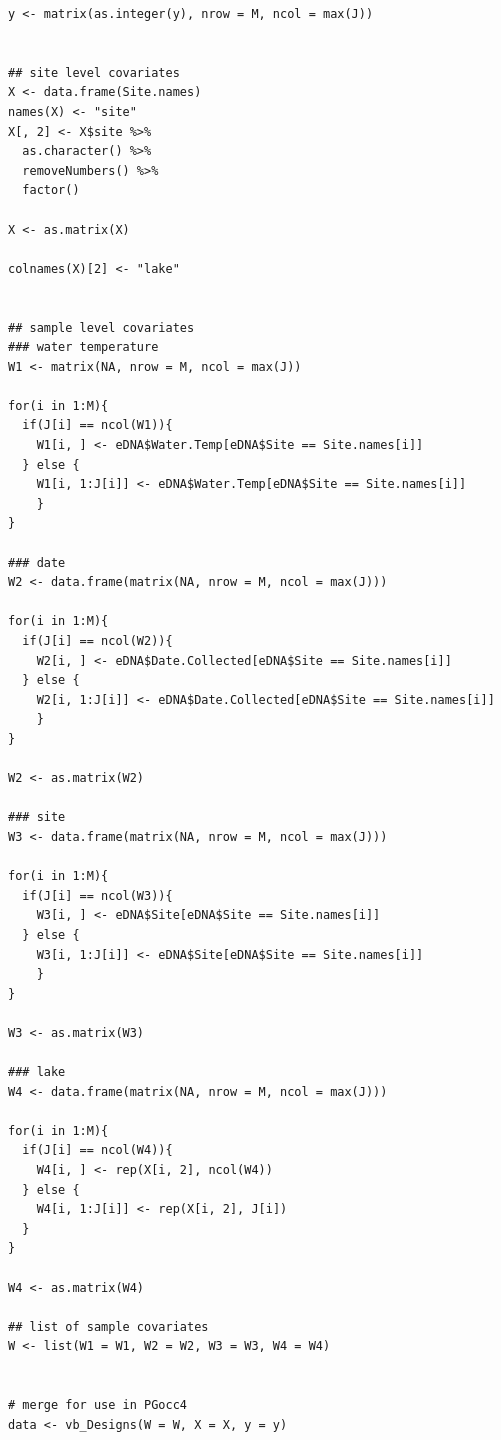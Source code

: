 \documentclass[12pt]{article}\usepackage[]{graphicx}\usepackage[]{color}
\makeatletter
\newenvironment{kframe}{%
 \def\at@end@of@kframe{}%
 \ifinner\ifhmode%
  \def\at@end@of@kframe{\end{minipage}}%
  \begin{minipage}{\columnwidth}%
 \fi\fi%
 \def\FrameCommand##1{\hskip\@totalleftmargin \hskip-\fboxsep
 \colorbox{shadecolor}{##1}\hskip-\fboxsep
     \hskip-\linewidth \hskip-\@totalleftmargin \hskip\columnwidth}%
 \MakeFramed {\advance\hsize-\width
   \@totalleftmargin\z@ \linewidth\hsize
   \@setminipage}}%
 {\par\unskip\endMakeFramed%
 \at@end@of@kframe}
\newenvironment{knitrout}{}{} %
\newenvironment{kframe}{%
 \def\at@end@of@kframe{}%
 \ifinner\ifhmode%
  \def\at@end@of@kframe{\end{minipage}}%
  \begin{minipage}{\columnwidth}%
 \fi\fi%
 \def\FrameCommand##1{\hskip\@totalleftmargin \hskip-\fboxsep
 \colorbox{shadecolor}{##1}\hskip-\fboxsep
     \hskip-\linewidth \hskip-\@totalleftmargin \hskip\columnwidth}%
 \MakeFramed {\advance\hsize-\width
   \@totalleftmargin\z@ \linewidth\hsize
   \@setminipage}}%
 {\par\unskip\endMakeFramed%
 \at@end@of@kframe}
\newenvironment{knitrout}{}{} %
\makeatother
\begin{document}
\begin{small}
\begin{knitrout}
\begin{kframe}
\begin{verbatim}
y <- matrix(as.integer(y), nrow = M, ncol = max(J))


## site level covariates
X <- data.frame(Site.names)
names(X) <- "site"
X[, 2] <- X$site %>%
  as.character() %>%
  removeNumbers() %>%
  factor()

X <- as.matrix(X)

colnames(X)[2] <- "lake"


## sample level covariates
### water temperature
W1 <- matrix(NA, nrow = M, ncol = max(J))

for(i in 1:M){
  if(J[i] == ncol(W1)){
    W1[i, ] <- eDNA$Water.Temp[eDNA$Site == Site.names[i]]
  } else {
    W1[i, 1:J[i]] <- eDNA$Water.Temp[eDNA$Site == Site.names[i]]
    }
}

### date
W2 <- data.frame(matrix(NA, nrow = M, ncol = max(J)))

for(i in 1:M){
  if(J[i] == ncol(W2)){
    W2[i, ] <- eDNA$Date.Collected[eDNA$Site == Site.names[i]]
  } else {
    W2[i, 1:J[i]] <- eDNA$Date.Collected[eDNA$Site == Site.names[i]]
    }
}

W2 <- as.matrix(W2)

### site 
W3 <- data.frame(matrix(NA, nrow = M, ncol = max(J)))

for(i in 1:M){
  if(J[i] == ncol(W3)){
    W3[i, ] <- eDNA$Site[eDNA$Site == Site.names[i]]
  } else {
    W3[i, 1:J[i]] <- eDNA$Site[eDNA$Site == Site.names[i]]
    }
}

W3 <- as.matrix(W3)

### lake
W4 <- data.frame(matrix(NA, nrow = M, ncol = max(J)))

for(i in 1:M){
  if(J[i] == ncol(W4)){
    W4[i, ] <- rep(X[i, 2], ncol(W4))
  } else {
    W4[i, 1:J[i]] <- rep(X[i, 2], J[i])
  }
}

W4 <- as.matrix(W4)

## list of sample covariates
W <- list(W1 = W1, W2 = W2, W3 = W3, W4 = W4)


# merge for use in PGocc4
data <- vb_Designs(W = W, X = X, y = y)



\end{verbatim}
\end{kframe}
\end{knitrout}
\end{small}
\end{document}
